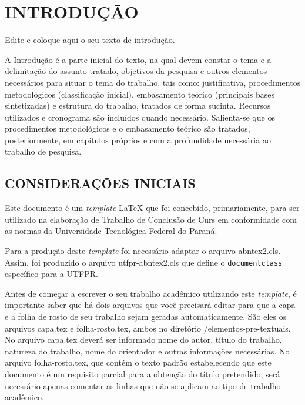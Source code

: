 
\chapter{INTRODUÇÃO}
\label{chap:introducao}

Edite e coloque aqui o seu texto de introdução.

A Introdução é a parte inicial do texto, na qual devem constar o tema e a delimitação do assunto tratado, objetivos da pesquisa e outros elementos necessários para situar o tema do trabalho, tais como: justificativa, procedimentos metodológicos (classificação inicial), embasamento teórico (principais bases sintetizadas) e estrutura do trabalho, tratados de forma sucinta. Recursos utilizados e cronograma são incluídos quando necessário. Salienta-se que os procedimentos metodológicos e o embasamento teórico são tratados, posteriormente, em capítulos próprios e com a profundidade necessária ao trabalho de pesquisa.

\section{CONSIDERAÇÕES INICIAIS}
\label{sec:consideracoesIniciais}

Este documento é um \emph{template} \LaTeX{} que foi concebido, primariamente, para ser utilizado na elaboração de Trabalho de Conclusão de Curs em conformidade com as normas da Universidade Tecnológica Federal do Paraná.

Para a produção deste \emph{template} foi necessário adaptar o arquivo {\ttfamily abntex2.cls}. Assim, foi produzido o arquivo {\ttfamily utfpr-abntex2.cls} que define o \verb|documentclass| específico para a UTFPR.

Antes de começar a escrever o seu trabalho acadêmico utilizando este \emph{template}, é importante saber que há dois arquivos que você precisará editar para que a capa e a folha de rosto de seu trabalho sejam geradas automaticamente.
São eles os arquivos {\ttfamily capa.tex} e {\ttfamily folha-rosto.tex}, ambos no diretório  {\ttfamily /elementos-pre-textuais}.
No arquivo {\ttfamily capa.tex} deverá ser informado nome do autor, título do trabalho, natureza do trabalho, nome do orientador e outras informações necessárias.
No arquivo {\ttfamily folha-rosto.tex}, que contém o texto padrão estabelecendo que este documento é um requisito parcial para a obtenção do título pretendido, será necessário apenas comentar as linhas que não se aplicam ao tipo de trabalho acadêmico.

